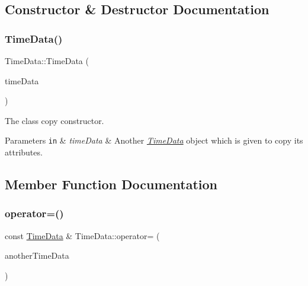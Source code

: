 \subsection{Constructor \& Destructor Documentation}
\mbox{\label{structTimeData_af0454b54d768d6b21267b3692dae4d3d}} 
\subsubsection{\texorpdfstring{Time\+Data()}{TimeData()}}
{\footnotesize\ttfamily Time\+Data\+::\+Time\+Data (\begin{DoxyParamCaption}\item[{const \hyperlink{structTimeData}{Time\+Data} \&}]{time\+Data }\end{DoxyParamCaption})\hspace{0.3cm}{\ttfamily [inline]}}



The class\textquotesingle{} copy constructor. 


\begin{DoxyParams}[1]{Parameters}
\mbox{\tt in}  & {\em time\+Data} & Another {\itshape \hyperlink{structTimeData}{Time\+Data}} object which is given to copy its attributes. \\
\hline
\end{DoxyParams}


\subsection{Member Function Documentation}
\mbox{\label{structTimeData_afa65d92842691d57ee5e2428f2156eef}} 
\subsubsection{\texorpdfstring{operator=()}{operator=()}}
{\footnotesize\ttfamily const \hyperlink{structTimeData}{Time\+Data} \& Time\+Data\+::operator= (\begin{DoxyParamCaption}\item[{const \hyperlink{structTimeData}{Time\+Data} \&}]{another\+Time\+Data }\end{DoxyParamCaption})}



